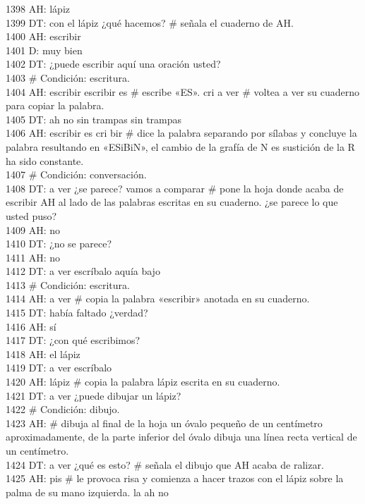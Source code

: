 1398 AH: lápiz\\
1399 DT: con el lápiz ¿qué hacemos? # señala el cuaderno de AH.\\
1400 AH: escribir\\
1401 D: muy bien\\
1402 DT: ¿puede escribir aquí una oración usted?\\
1403 # Condición: escritura.\\
1404 AH: escribir escribir es # escribe «ES». cri a ver # voltea a ver su cuaderno para copiar la palabra. \\
1405 DT: ah no sin trampas sin trampas\\
1406 AH: escribir es cri bir # dice la palabra separando por sílabas y concluye la palabra resultando en «ESiBiN», el cambio de la grafía de N es sustición de la R ha sido constante.\\
1407 # Condición: conversación.\\
1408 DT: a ver ¿se parece? vamos a comparar # pone la hoja donde acaba de escribir AH al lado de las palabras escritas en su cuaderno. ¿se parece lo que usted puso?\\
1409 AH: no\\
1410 DT: ¿no se parece?\\
1411 AH: no\\
1412 DT: a ver escríbalo aquía bajo\\
1413 # Condición: escritura.\\
1414 AH: a ver # copia la palabra «escribir» anotada en su cuaderno.\\
1415 DT: había faltado ¿verdad?\\
1416 AH: sí\\
1417 DT: ¿con qué escribimos?\\
1418 AH: el lápiz\\
1419 DT: a ver escríbalo\\
1420 AH: lápiz # copia la palabra lápiz escrita en su cuaderno.\\
1421 DT: a ver ¿puede dibujar un lápiz?\\
1422 # Condición: dibujo.\\
1423 AH: # dibuja al final de la hoja un óvalo pequeño de un centímetro aproximadamente, de la parte inferior del óvalo dibuja una línea recta vertical de un centímetro.\\
1424 DT: a ver ¿qué es esto? # señala el dibujo que AH acaba de ralizar.\\
1425 AH: pis # le provoca risa y comienza a hacer trazos con el lápiz sobre la palma de su mano izquierda. la ah no\\
